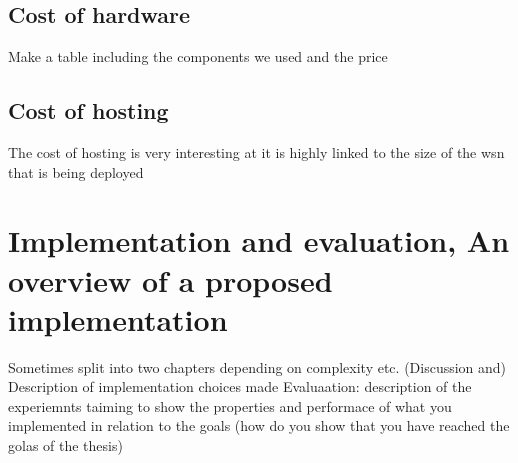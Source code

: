 \documentclass[]{uiophd}
\begin{document}
\section{Cost of hardware}
Make a table including the components we used and the price

\section{Cost of hosting}
The cost of hosting is very interesting at it is highly linked to the size of the wsn that is being deployed



\chapter{Implementation and evaluation, An overview of a proposed implementation}

Sometimes split into two chapters depending on complexity etc.
(Discussion and) Description of implementation choices made 
Evaluaation: description of the experiemnts taiming to show the properties 
and performace of what you implemented in relation to the goals (how do you show that you have reached the golas of the thesis)
\end{document}
